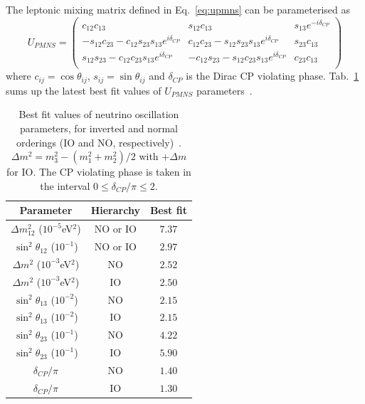 The leptonic mixing matrix defined in Eq.~\eqref{eq:upmns} can be parameterised as
\begin{equation}
  U_{PMNS}=
  \begin{pmatrix}
    c_{12}c_{13} & s_{12}c_{13} & s_{13}e^{-i\delta_{CP}} \\
    -s_{12}c_{23}-c_{12}s_{23}s_{13}e^{i\delta_{CP}} & c_{12}c_{23}-s_{12}s_{23}s_{13}e^{i\delta_{CP}} & s_{23}c_{13} \\
    s_{12}s_{23}-c_{12}c_{23}s_{13}e^{i\delta_{CP}} &  -c_{12}s_{23}-s_{12}c_{23}s_{13}e^{i\delta_{CP}} &  c_{23}c_{13} \\
  \end{pmatrix}
  \label{eq:upmns_detail}
\end{equation}
where $c_{ij}=\cos{\theta_{ij}}$, $s_{ij}=\sin{\theta_{ij}}$ and $\delta_{CP}$ is the Dirac CP violating phase.
Tab.~\ref{tab:best_fit} sums up the latest best fit values of $U_{PMNS}$ parameters~\cite{art:Capozzi_2017}.
\begin{table}[h]
  \centering
  \begin{tabular}{|c|c|c|}
    \hline
    Parameter & Hierarchy & Best fit \\
    \hline\hline
    $\Delta m^{2}_{12}$ ($10^{-5}$eV$^{2}$) & NO or IO & $7.37$ \\
    \hline
    $\sin^{2}\theta_{12}$ ($10^{-1}$) & NO or IO & $2.97$ \\
    \hline
    $\Delta m^2$ ($10^{-3}$eV$^{2}$) & NO & $2.52$ \\
    $\Delta m^2$ ($10^{-3}$eV$^{2}$) & IO & $2.50$ \\
    \hline
    $\sin^{2}\theta_{13}$ ($10^{-2}$) & NO & $2.15$ \\
    $\sin^{2}\theta_{13}$ ($10^{-2}$) & IO & $2.15$ \\
    \hline
    $\sin^{2}\theta_{23}$ ($10^{-1}$) & NO & $4.22$ \\
    $\sin^{2}\theta_{23}$ ($10^{-1}$) & IO & $5.90$ \\
    \hline
    $\delta_{CP}/\pi$ & NO & $1.40$ \\
    $\delta_{CP}/\pi$ & IO & $1.30$ \\
    \hline
  \end{tabular}
  \caption{Best fit values of neutrino oscillation parameters, for inverted and normal orderings (IO and NO, respectively)~\cite{art:Capozzi_2017}.
    ${\Delta m^{2}=m_3^2-(m_1^2+m_2^2)/2}$ with $+\Delta m$ for IO.
    The CP violating phase is taken in the interval $0\leq\delta_{CP}/\pi\leq2$.
    \label{tab:best_fit}}
\end{table}

